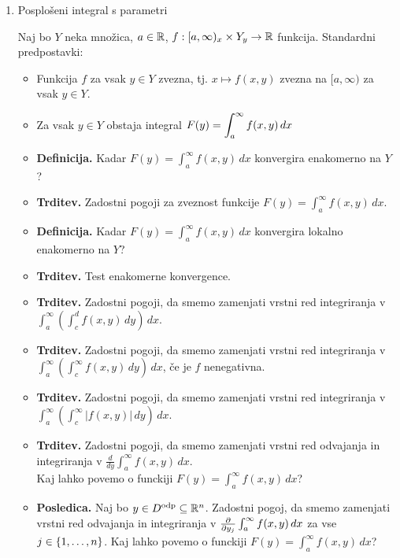 \begin{enumerate}
    \item Posplošeni integral s parametri
    
    Naj bo $Y$ neka množica, $a \in \mathbb{R}$, $f: [a, \infty)_x \times Y_y \to \mathbb{R}$ funkcija. Standardni predpostavki:
    \begin{itemize}
        \item[] Funkcija $f$ za vsak $y \in Y$ zvezna, tj. $x \mapsto f(x,y)$ zvezna na $[a, \infty)$ za vsak \(y \in Y\).
        \item[] Za vsak \(y \in Y\) obstaja integral \( \displaystyle F(y)= \int_{a}^{\infty} f(x,y) \,dx \)
    \end{itemize}
    \begin{itemize}
        \item \colorbox{purple!30}{\textbf{Definicija.}} Kadar \( F(y) = \int_{a}^{\infty} f(x,y) \, dx\) konvergira enakomerno na \(Y\)?
        \item \colorbox{blue!30}{\textbf{Trditev.}} Zadostni pogoji za zveznost funkcije $F(y) = \int_{a}^{\infty} f(x,y) \, dx$.
        \item \colorbox{purple!30}{\textbf{Definicija.}} Kadar \( F(y) = \int_{a}^{\infty} f(x,y) \, dx\) konvergira lokalno enakomerno na \(Y\)?
        \item \colorbox{blue!30}{\textbf{Trditev.}} Test enakomerne konvergence.
        \item \colorbox{blue!30}{\textbf{Trditev.}} Zadostni pogoji, da smemo zamenjati vrstni red integriranja v \(\int_{a}^{\infty}\left(\int_{c}^{d} f(x,y) \, dy\right) \, dx\).
        \item \colorbox{blue!30}{\textbf{Trditev.}} Zadostni pogoji, da smemo zamenjati vrstni red integriranja v \(\int_{a}^{\infty}\left(\int_{c}^{\infty} f(x,y) \, dy\right) \, dx\), če je $f$ nenegativna.
        \item \colorbox{blue!30}{\textbf{Trditev.}} Zadostni pogoji, da smemo zamenjati vrstni red integriranja v \(\int_{a}^{\infty}\left(\int_{c}^{\infty} |f(x,y)| \, dy\right) \, dx\).
        \item \colorbox{blue!30}{\textbf{Trditev.}} Zadostni pogoji, da smemo zamenjati vrstni red odvajanja in integriranja v \(\frac{d}{dy} \int_{a}^{\infty}f(x,y) \, dx\).
        \\ Kaj lahko povemo o funckiji $F(y) = \int_{a}^{\infty}f(x,y) \, dx$?
        \item \colorbox{orange!30}{\textbf{Posledica.}} Naj bo \(y \in D^\text{odp} \subseteq \mathbb{R}^n\). Zadostni pogoj, da smemo zamenjati vrstni red odvajanja in integriranja v \(\frac{\partial }{\partial y_j} \int_{a}^{\infty}f(x,y) \, dx\) za vse \(j \in \left\{1, \ldots, n\right\}\).  Kaj lahko povemo o funckiji $F(y) = \int_{a}^{\infty}f(x,y) \, dx$?

\end{itemize}
\end{enumerate}
